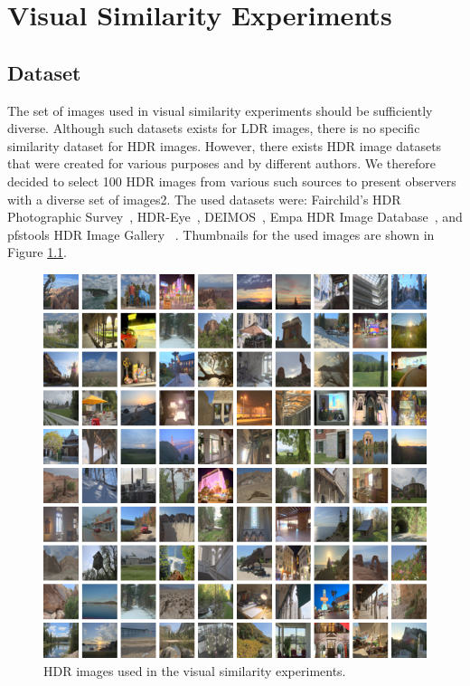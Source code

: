 \chapter{Visual Similarity Experiments}
\label{chp:b5}

\section{Dataset}

The set of images used in visual similarity experiments should be sufficiently diverse. Although such datasets exists for LDR images, there is no specific similarity dataset for HDR images. However, there exists HDR image datasets that were created for various purposes and by different authors. We therefore decided to select 100 HDR images from various such sources to present observers with a diverse set of images2. The used datasets were: Fairchild’s HDR Photographic Survey~\cite{fairchild2007hdr}, HDR-Eye~\cite{nemoto2015visual}, DEIMOS~\cite{klima2011deimos}, Empa HDR Image Database~\cite{EmpaHDR}, and pfstools HDR Image Gallery ~\cite{mantiuk2007high}. Thumbnails for the used images are shown in Figure \ref{fig:dataset}.

\begin{figure}
\begin{center}
\includegraphics[width=\textwidth]{figures/chapter3/dataset.png}
\caption{HDR images used in the visual similarity experiments.}
\label{fig:dataset}
\end{center}
\end{figure}


